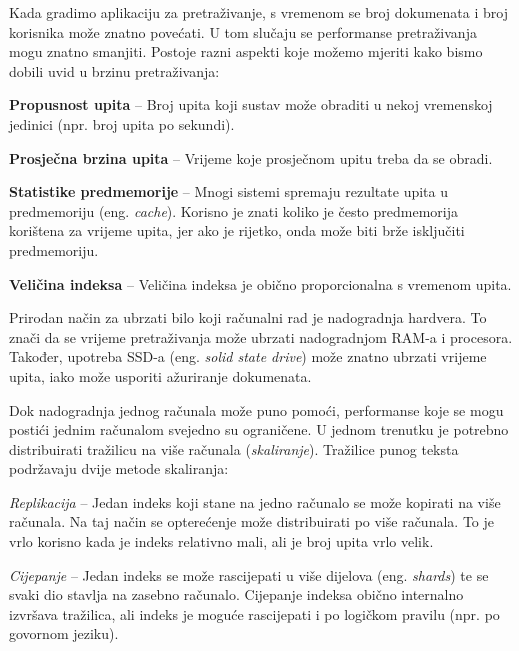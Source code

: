 \documentclass[a4paper,twoside,12pt]{scrreprt}
\begin{document}
Kada gradimo aplikaciju za pretraživanje, s vremenom se broj dokumenata i broj korisnika može znatno povećati. U tom slučaju se performanse pretraživanja mogu znatno smanjiti. Postoje razni aspekti koje možemo mjeriti kako bismo dobili uvid u brzinu pretraživanja:

\begin{compactitem}
  \item \textbf{Propusnost upita} – Broj upita koji sustav može obraditi u nekoj vremenskoj jedinici (npr. broj upita po sekundi).
  \item \textbf{Prosječna brzina upita} – Vrijeme koje prosječnom upitu treba da se obradi.
  \item \textbf{Statistike predmemorije} – Mnogi sistemi spremaju rezultate upita u predmemoriju (eng. \textit{cache}). Korisno je znati koliko je često predmemorija korištena za vrijeme upita, jer ako je rijetko, onda može biti brže isključiti predmemoriju.
  \item \textbf{Veličina indeksa} – Veličina indeksa je obično proporcionalna s vremenom upita.
\end{compactitem}

Prirodan način za ubrzati bilo koji računalni rad je nadogradnja hardvera. To znači da se vrijeme pretraživanja može ubrzati nadogradnjom RAM-a i procesora. Također, upotreba SSD-a (eng. \textit{solid state drive}) može znatno ubrzati vrijeme upita, iako može usporiti ažuriranje dokumenata.

Dok nadogradnja jednog računala može puno pomoći, performanse koje se mogu postići jednim računalom svejedno su ograničene. U jednom trenutku je potrebno distribuirati tražilicu na više računala (\textit{skaliranje}). Tražilice punog teksta podržavaju dvije metode skaliranja:

\begin{compactenum}
  \item \textit{Replikacija} – Jedan indeks koji stane na jedno računalo se može kopirati na više računala. Na taj način se opterećenje može distribuirati po više računala. To je vrlo korisno kada je indeks relativno mali, ali je broj upita vrlo velik.
  \item \textit{Cijepanje} – Jedan indeks se može rascijepati u više dijelova (eng. \textit{shards}) te se svaki dio stavlja na zasebno računalo. Cijepanje indeksa obično internalno izvršava tražilica, ali indeks je moguće rascijepati i po logičkom pravilu (npr. po govornom jeziku).
\end{compactenum}
\end{document}
